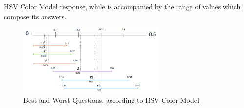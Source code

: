 HSV Color Model response, while is accompanied by the range of values which compose its answers. \par
%
\begin{figure}[!htbp]
  \centering
  \vspace{-15pt}
  \includegraphics[width=0.65\textwidth]{images/results/hsv_questions_analysis.png}
  \caption[Best and Worst Questions, according to HSV Color Model.]{Best and Worst Questions, according to HSV Color Model.}
  \label{fig:hsv_analysis}
  \vspace{-5pt}
\end{figure}
%
%
